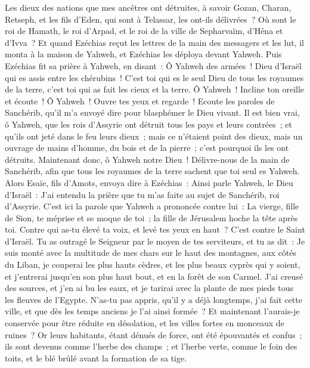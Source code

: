 \begin{multicols}{2}
Les dieux des nations que mes ancêtres ont détruites, à savoir Gozan, Charan, Retseph, et les fils d'Eden, qui sont à Telassar, les ont-ils délivrées~?
Où sont le roi de Hamath, le roi d'Arpad, et le roi de la ville de Sepharvaïm, d'Héna et d'Ivva~?
Et quand Ezéchias reçut les lettres de la main des messagers et les lut, il monta à la maison de Yahweh, et Ezéchias les déploya devant Yahweh.
Puis Ezéchias fit sa prière à Yahweh, en disant~:
Ô Yahweh des armées~! Dieu d'Israël qui es assis entre les chérubins~! C'est toi qui es le seul Dieu de tous les royaumes de la terre, c'est toi qui as fait les cieux et la terre.
Ô Yahweh~! Incline ton oreille et écoute~! Ô Yahweh~! Ouvre tes yeux et regarde~! Ecoute les paroles de Sanchérib, qu'il m'a envoyé dire pour blasphémer le Dieu vivant.
Il est bien vrai, ô Yahweh, que les rois d'Assyrie ont détruit tous les pays et leurs contrées~;
et qu'ils ont jeté dans le feu leurs dieux~; mais ce n'étaient point des dieux, mais un ouvrage de mains d'homme, du bois et de la pierre~; c'est pourquoi ils les ont détruits.
Maintenant donc, ô Yahweh notre Dieu~! Délivre-nous de la main de Sanchérib, afin que tous les royaumes de la terre sachent que toi seul es Yahweh.
Alors Esaïe, fils d'Amots, envoya dire à Ezéchias~: Ainsi parle Yahweh, le Dieu d'Israël~: J'ai entendu la prière que tu m'as faite au sujet de Sanchérib, roi d'Assyrie.
C'est ici la parole que Yahweh a prononcée contre lui~: La vierge, fille de Sion, te méprise et se moque de toi~; la fille de Jérusalem hoche la tête après toi.
Contre qui as-tu élevé ta voix, et levé tes yeux en haut~? C'est contre le Saint d'Israël.
Tu as outragé le Seigneur par le moyen de tes serviteurs, et tu as dit~: Je suis monté avec la multitude de mes chars sur le haut des montagnes, aux côtés du Liban, je couperai les plus hauts cèdres, et les plus beaux cyprès qui y soient, et j'entrerai jusqu'en son plus haut bout, et en la forêt de son Carmel.
J'ai creusé des sources, et j'en ai bu les eaux, et je tarirai avec la plante de mes pieds tous les fleuves de l'Egypte.
N'as-tu pas appris, qu'il y a déjà longtemps, j'ai fait cette ville, et que dès les temps anciens je l'ai ainsi formée~? Et maintenant l'aurais-je conservée pour être réduite en désolation, et les villes fortes en monceaux de ruines~?
Or leurs habitants, étant dénués de force, ont été épouvantés et confus~; ils sont devenus comme l'herbe des champs~; et l'herbe verte, comme le foin des toits, et le blé brûlé avant la formation de sa tige.

\end{multicols}
